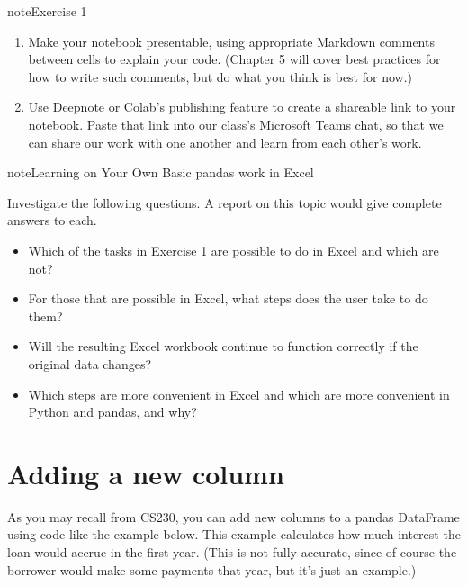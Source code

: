 \documentclass[letterpaper,10pt,english]{sphinxmanual}
\begin{document}
\begin{sphinxadmonition}{note}{Exercise 1}
\begin{enumerate}
\begin{itemize}
\item {} 
Repeat the previous bullet point, but for Asian applicants, stored in a variable named .

\item {} 
Repeat the previous bullet point, but for applicants whose age is 75 or over, stored in a variable .

\end{itemize}

\item {} 
Make your notebook presentable, using appropriate Markdown comments between cells to explain your code.  (Chapter 5 will cover best practices for how to write such comments, but do what you think is best for now.)

\item {} 
Use Deepnote or Colab’s publishing feature to create a shareable link to your notebook.  Paste that link into our class’s Microsoft Teams chat, so that we can share our work with one another and learn from each other’s work.

\end{enumerate}
\end{sphinxadmonition}

\begin{sphinxadmonition}{note}{Learning on Your Own \sphinxhyphen{} Basic pandas work in Excel}

Investigate the following questions.  A report on this topic would give complete answers to each.
\begin{itemize}
\item {} 
Which of the tasks in Exercise 1 are possible to do in Excel and which are not?

\item {} 
For those that are possible in Excel, what steps does the user take to do them?

\item {} 
Will the resulting Excel workbook continue to function correctly if the original data changes?

\item {} 
Which steps are more convenient in Excel and which are more convenient in Python and pandas, and why?

\end{itemize}
\end{sphinxadmonition}


\section{Adding a new column}
\label{\detokenize{chapter-4-review-of-python-and-pandas:adding-a-new-column}}
As you may recall from CS230, you can add new columns to a pandas DataFrame using code like the example below.  This example calculates how much interest the loan would accrue in the first year.  (This is not fully accurate, since of course the borrower would make some payments that year, but it’s just an example.)
\end{document}

